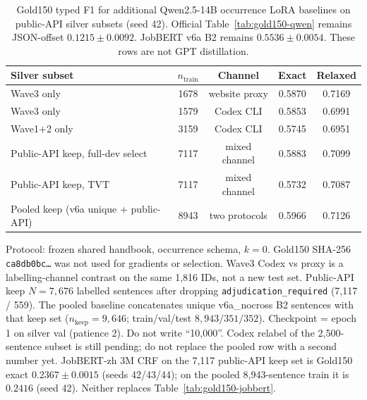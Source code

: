 
\begin{table}[t]
\caption{Gold150 typed F1 for additional Qwen2.5-14B occurrence LoRA baselines on public-API silver subsets (seed 42). Official Table~\ref{tab:gold150-qwen} remains JSON-offset $0.1215\pm0.0092$. JobBERT v6a B2 remains $0.5536\pm0.0054$. These rows are not GPT distillation.}
\label{tab:public-api-silver-qwen}
\centering
\begin{tabular}{lcccc}
\hline
Silver subset & $n_{\mathrm{train}}$ & Channel & Exact & Relaxed \\
\hline
Wave3 only & 1678 & website proxy & 0.5870 & 0.7169 \\
Wave3 only & 1579 & Codex CLI & 0.5853 & 0.6991 \\
Wave1+2 only & 3159 & Codex CLI & 0.5745 & 0.6951 \\
Public-API keep, full-dev select & 7117 & mixed channel & 0.5883 & 0.7099 \\
Public-API keep, TVT & 7117 & mixed channel & 0.5732 & 0.7087 \\
Pooled keep (v6a unique + public-API) & 8943 & two protocols & 0.5966 & 0.7126 \\
\hline
\end{tabular}

\vspace{0.4em}
{\small Protocol: frozen shared handbook, occurrence schema, $k{=}0$. Gold150 SHA-256 \texttt{ca8db0bc\ldots} was not used for gradients or selection.
Wave3 Codex vs proxy is a labelling-channel contrast on the same 1,816 IDs, not a new test set.
Public-API keep $N{=}7{,}676$ labelled sentences after dropping \texttt{adjudication\_required} (7,117 / 559).
The pooled baseline concatenates unique v6a\_nocross B2 sentences with that keep set ($n_{\mathrm{keep}}{=}9{,}646$; train/val/test $8{,}943/351/352$). Checkpoint = epoch 1 on silver val (patience 2). Do not write ``10,000''. Codex relabel of the 2,500-sentence subset is still pending; do not replace the pooled row with a second number yet.
JobBERT-zh 3M CRF on the 7,117 public-API keep set is Gold150 exact $0.2367\pm0.0015$ (seeds 42/43/44); on the pooled 8,943-sentence train it is $0.2416$ (seed 42). Neither replaces Table~\ref{tab:gold150-jobbert}.}
\end{table}
